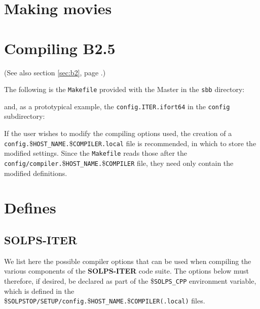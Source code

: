 \documentclass[a4paper,10pt]{report}
\newcommand\SOLPSITER{{\bf SOLPS-ITER} }
\begin{document}
\section{Making movies}

\section{Compiling B2.5}
\label{sec:compilingb2}

(See also section \ref{sec:b2}, page \pageref{sec:b2}.)

The following is the {\tt Makefile} provided with the Master
in the {\tt sbb} directory:



and, as a prototypical example, the {\tt config.ITER.ifort64} in
the {\tt config} subdirectory: 



If the user wishes to modify the compiling options used, the creation
of a {\tt config.}\${\tt {HOST\_NAME}.}\${\tt {COMPILER}.local} file
is recommended, in which to store the modified settings. Since the {\tt Makefile}
reads those after the
{\tt config/compiler.\allowbreak}\${\tt {HOST\_NAME}.}\${\tt {COMPILER}} file,
they need only contain the modified definitions.

\section{Defines}

\subsection{SOLPS-ITER}

We list here the possible compiler options that can be used when compiling the
various components of the \SOLPSITER code suite. The options below must therefore,
if desired, be declared as part of the \${\tt SOLPS\_CPP} environment variable,
which is defined in the
\${\tt SOLPSTOP/SETUP/config.}\${\tt {HOST\_NAME}.}\${\tt {COMPILER}(.local)} files.
\end{document}
